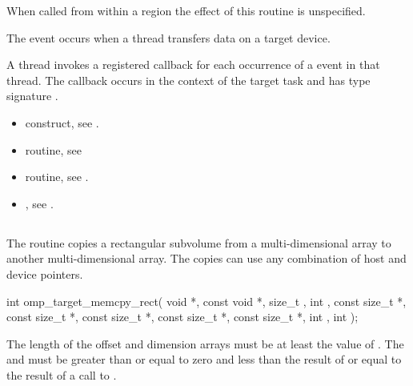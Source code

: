 \begin{ccppspecific}
When called from within a  region
the effect of this routine is unspecified.

\events
The  event occurs when a thread transfers data on a target device.

\tools
A thread invokes a registered 
callback for each occurrence of a  event in that 
thread. The callback occurs in the context of the target task and has 
type signature .

\crossreferences
\begin{itemize}
\item {} construct, see .

\item {} routine, see

\item {} routine, see .


\item {}, see
.
\end{itemize}



\subsection{}
\label{subsec:omp_target_memcpy_rect}
\summary
The  routine copies a rectangular subvolume from
a multi-dimensional array to another multi-dimensional array. The copies can
use any combination of host and device pointers.

\format
\begin{samepage}
\begin{ompcFunction}
int omp_target_memcpy_rect(
  void *,
  const void *,
  size_t ,
  int ,
  const size_t *,
  const size_t *,
  const size_t *,
  const size_t *,
  const size_t *,
  int ,
  int 
);
\end{ompcFunction}
\end{samepage}

\constraints
The length of the offset and dimension arrays must be at least the
value of . The  and 
must be greater than or equal to zero and less than the result of
 or equal to the result of a call to
.


\end{ccppspecific}
